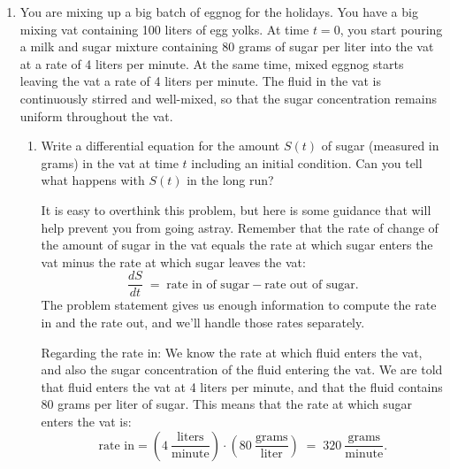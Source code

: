 \documentclass[main]{subfiles}
\begin{document}
\begin{enumerate}
    \item
  
  You are mixing up a big batch
  of eggnog for the holidays.  You have a big mixing vat
  containing 100 liters of egg yolks.  At time $t = 0$, you
  start pouring a milk and sugar mixture containing 80 grams of sugar per
  liter into the vat at a rate of 4 liters per minute.  At the same  
  time, mixed eggnog starts leaving the vat a rate of 4 liters per  
  minute.  The fluid in the vat is continuously stirred and well-mixed,
  so that the sugar concentration remains uniform throughout the vat.

  \begin{enumerate}
  \item
  \begin{problem}[2.5in]
  Write a differential equation for the amount $S(t)$ of sugar (measured
  in grams) in the vat at time $t$ including an initial condition.  Can you tell what happens with $S(t)$ in the long run?
  \end{problem}
  
  \begin{solution}
    It is easy to overthink this problem, but here is some guidance that
    will help prevent you from going astray.  Remember that the rate of 
    change of the amount of sugar in the vat equals the rate at which sugar 
    enters the vat minus the rate at which sugar leaves the vat:
    $$
      \frac{dS}{dt} \; = \; \mbox{rate in of sugar} - \mbox{rate out of sugar}.
    $$
    The problem statement gives us enough information to compute the rate in
    and the rate out, and we'll handle those rates separately.

    Regarding the rate in:  We know the rate at which fluid enters the vat, 
    and also the sugar concentration of the fluid entering the vat.  We
    are told that fluid enters the vat at 4 liters per minute, and that the
    fluid contains 80 grams per liter of sugar.  This means that the rate at
    which sugar enters the vat is:
    $$
      \mbox{rate in} =  \left( 4 \: \frac{\mbox{liters}}{\mbox{minute}} \right) \cdot
      \left( 80 \: \frac{\mbox{grams}}{\mbox{liter}} \right) \; = \; 320 \:
      \frac{\mbox{grams}}{\mbox{minute}}.
    $$


\end{solution}
\end{enumerate}
\end{enumerate}
\end{document}
